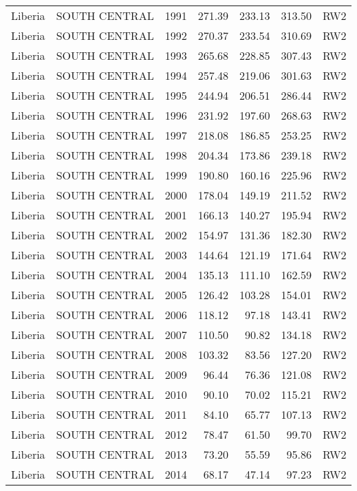 \begin{longtable}{lllrrrl}
  Liberia & SOUTH CENTRAL & 1991 & 271.39 & 233.13 & 313.50 & RW2 \\ 
  Liberia & SOUTH CENTRAL & 1992 & 270.37 & 233.54 & 310.69 & RW2 \\ 
  Liberia & SOUTH CENTRAL & 1993 & 265.68 & 228.85 & 307.43 & RW2 \\ 
  Liberia & SOUTH CENTRAL & 1994 & 257.48 & 219.06 & 301.63 & RW2 \\ 
  Liberia & SOUTH CENTRAL & 1995 & 244.94 & 206.51 & 286.44 & RW2 \\ 
  Liberia & SOUTH CENTRAL & 1996 & 231.92 & 197.60 & 268.63 & RW2 \\ 
  Liberia & SOUTH CENTRAL & 1997 & 218.08 & 186.85 & 253.25 & RW2 \\ 
  Liberia & SOUTH CENTRAL & 1998 & 204.34 & 173.86 & 239.18 & RW2 \\ 
  Liberia & SOUTH CENTRAL & 1999 & 190.80 & 160.16 & 225.96 & RW2 \\ 
  Liberia & SOUTH CENTRAL & 2000 & 178.04 & 149.19 & 211.52 & RW2 \\ 
  Liberia & SOUTH CENTRAL & 2001 & 166.13 & 140.27 & 195.94 & RW2 \\ 
  Liberia & SOUTH CENTRAL & 2002 & 154.97 & 131.36 & 182.30 & RW2 \\ 
  Liberia & SOUTH CENTRAL & 2003 & 144.64 & 121.19 & 171.64 & RW2 \\ 
  Liberia & SOUTH CENTRAL & 2004 & 135.13 & 111.10 & 162.59 & RW2 \\ 
  Liberia & SOUTH CENTRAL & 2005 & 126.42 & 103.28 & 154.01 & RW2 \\ 
  Liberia & SOUTH CENTRAL & 2006 & 118.12 & 97.18 & 143.41 & RW2 \\ 
  Liberia & SOUTH CENTRAL & 2007 & 110.50 & 90.82 & 134.18 & RW2 \\ 
  Liberia & SOUTH CENTRAL & 2008 & 103.32 & 83.56 & 127.20 & RW2 \\ 
  Liberia & SOUTH CENTRAL & 2009 & 96.44 & 76.36 & 121.08 & RW2 \\ 
  Liberia & SOUTH CENTRAL & 2010 & 90.10 & 70.02 & 115.21 & RW2 \\ 
  Liberia & SOUTH CENTRAL & 2011 & 84.10 & 65.77 & 107.13 & RW2 \\ 
  Liberia & SOUTH CENTRAL & 2012 & 78.47 & 61.50 & 99.70 & RW2 \\ 
  Liberia & SOUTH CENTRAL & 2013 & 73.20 & 55.59 & 95.86 & RW2 \\ 
  Liberia & SOUTH CENTRAL & 2014 & 68.17 & 47.14 & 97.23 & RW2 \\ 

\end{longtable}
